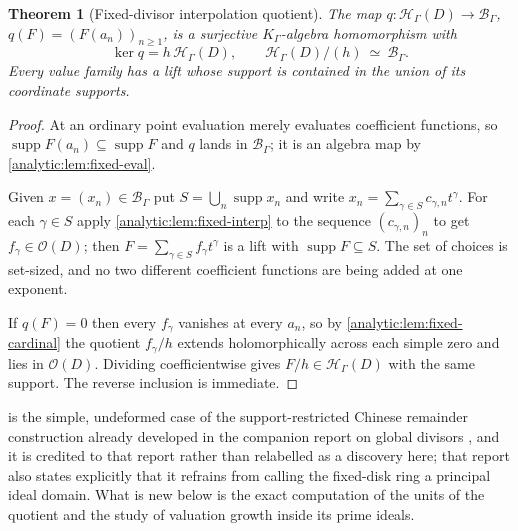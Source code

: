 \documentclass[11pt,letterpaper]{article}
\newtheorem{theorem}{Theorem}[section]
\theoremstyle{definition}
\theoremstyle{remark}
\newcommand{\HH}{\mathcal H}
\newcommand{\BB}{\mathcal B}
\newcommand{\OO}{\mathcal O}
\newcommand{\supp}{\operatorname{supp}}
\numberwithin{equation}{section}
\begin{document}
\begin{theorem}[Fixed-divisor interpolation quotient]
\label{analytic:thm:fixed-quotient}
The map $q:\HH_\Gamma(D)\to\BB_\Gamma$, $q(F)=(F(a_n))_{n\ge1}$, is a
surjective $K_\Gamma$-algebra homomorphism with
\begin{equation}\label{analytic:eq:fixed-quotient}
 \ker q=h\,\HH_\Gamma(D),\qquad
 \HH_\Gamma(D)/(h)\ \simeq\ \BB_\Gamma .
\end{equation}
Every value family has a lift whose support is contained in the union of
its coordinate supports.
\end{theorem}
\begin{proof}
At an ordinary point evaluation merely evaluates coefficient functions, so
$\supp F(a_n)\subseteq\supp F$ and $q$ lands in $\BB_\Gamma$; it is an
algebra map by \cref{analytic:lem:fixed-eval}.

Given $x=(x_n)\in\BB_\Gamma$ put $S=\bigcup_n\supp x_n$ and write
$x_n=\sum_{\gamma\in S}c_{\gamma,n}t^\gamma$. For each $\gamma\in S$ apply
\cref{analytic:lem:fixed-interp} to the sequence $(c_{\gamma,n})_n$ to get
$f_\gamma\in\OO(D)$; then $F=\sum_{\gamma\in S}f_\gamma t^\gamma$ is a lift
with $\supp F\subseteq S$. The set of choices is set-sized, and no two
different coefficient functions are being added at one exponent.

If $q(F)=0$ then every $f_\gamma$ vanishes at every $a_n$, so by
\cref{analytic:lem:fixed-cardinal} the quotient $f_\gamma/h$ extends
holomorphically across each simple zero and lies in $\OO(D)$. Dividing
coefficientwise gives $F/h\in\HH_\Gamma(D)$ with the same support. The
reverse inclusion is immediate.
\end{proof}

 is the simple, undeformed case of the
support-restricted Chinese remainder construction already developed in the
companion report on global divisors \cite[\S10]{GlobalDivisors}, and it is
credited to that report rather than relabelled as a discovery here; that
report also states explicitly that it refrains from calling the fixed-disk
ring a principal ideal domain. What is new below is the exact computation
of the units of the quotient and the study of valuation growth inside its
prime ideals.
\end{document}
